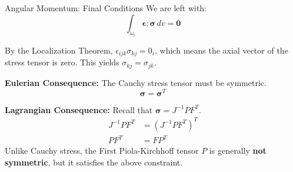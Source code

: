 \documentclass[aspectratio=169]{beamer}
\begin{document}
\begin{frame}{Angular Momentum: Final Conditions}
    We are left with:
    $$ \int_{\omega_t} \bm{\epsilon} : \bm{\sigma} \, dv = \bm{0} $$

    By the Localization Theorem, $\epsilon_{ijk} \sigma_{kj} = 0_i$, which means the axial vector of the stress tensor is zero. This yields $\sigma_{kj} = \sigma_{jk}$.

    \vspace{0.2cm}
    \textbf{Eulerian Consequence:} The Cauchy stress tensor must be symmetric.
    $$ \bm{\sigma} = \bm{\sigma}^T $$

    \vspace{0.2cm}
    \textbf{Lagrangian Consequence:} Recall that $\bm{\sigma} = J^{-1} P F^T$.
    \begin{align*}
        J^{-1} P F^T &= (J^{-1} P F^T)^T \\
        P F^T &= F P^T
    \end{align*}
    Unlike Cauchy stress, the First Piola-Kirchhoff tensor $P$ is generally \textbf{not symmetric}, but it satisfies the above constraint.
\end{frame}
\end{document}
